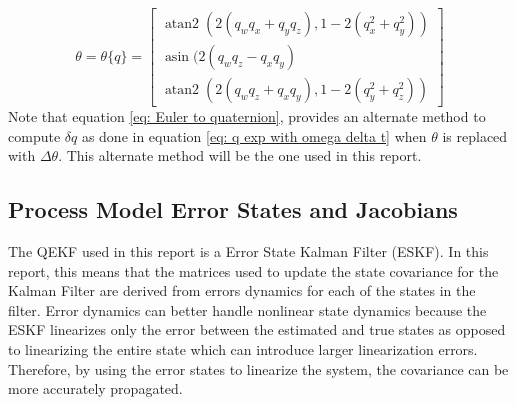 \begin{equation}
    \theta = \theta\{q\} =\left[\begin{array}{c}\operatorname{atan2}\left(2\left(q_w q_x+q_y q_z\right), 1-2\left(q_x^2+q_y^2\right)\right) \\ \operatorname{asin} (2 (q_w q_z - q_x q_y) \\ \operatorname{atan2}\left(2\left(q_w q_z+q_x q_y\right), 1-2\left(q_y^2+q_z^2\right)\right)\end{array}\right]
    \label{eq: Quaternion to Euler}
\end{equation}
Note that equation \eqref{eq: Euler to quaternion}, provides an alternate method to compute $\delta q$ as done in equation \eqref{eq: q exp with omega delta t} when $\theta$ is replaced with $\Delta \theta$. This alternate method will be the one used in this report.


\subsection{Process Model Error States and Jacobians}
The QEKF used in this report is a Error State Kalman Filter (ESKF). In this report, this means that the matrices used to update the state covariance for the Kalman Filter are derived from errors dynamics for each of the states in the filter. Error dynamics can better handle nonlinear state dynamics because the ESKF linearizes only the error between the estimated and true states as opposed to linearizing the entire state which can introduce larger linearization errors. Therefore, by using the error states to linearize the system, the covariance can be more accurately propagated.

